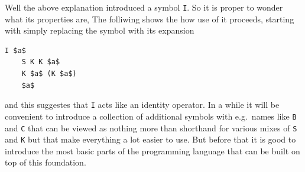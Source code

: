 Well the above explanation introduced a symbol \verb+I+. So it is
proper to wonder what its properties are, The folliwing shows the
how use of it proceeds, starting with simply replacing the symbol with
its expansion
\begin{lstlisting}[mathescape=true]
    I $a$
    S K K $a$
    K $a$ (K $a$)
    $a$
\end{lstlisting}
and this suggestes that \verb+I+ acts like an identity operator.
In a while it will be convenient to introduce a collection of additional
symbols with e.g.\ names like \verb+B+ and \verb+C+ that can be viewed as
nothing more than shorthand for various mixes of \verb+S+ and \verb+K+ but
that make everything a lot easier to use. But before that it is good to
introduce the most basic parts of the programming language that can be
built on top of this foundation.

